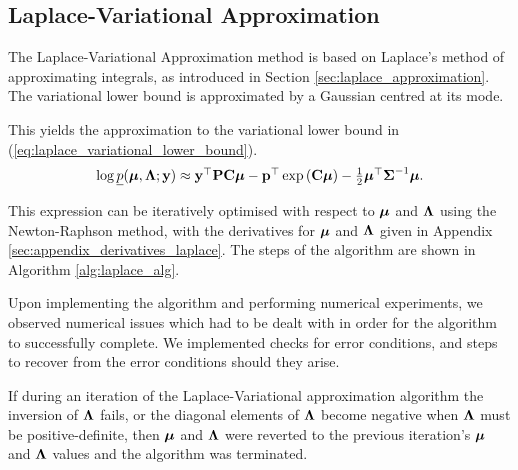 \subsection{Laplace-Variational Approximation}
The Laplace-Variational Approximation method is based on Laplace's method of approximating integrals, as
introduced in Section \ref{sec:laplace_approximation}. The variational lower bound  is approximated by a
Gaussian centred at its mode.

This yields the approximation to the variational lower bound in (\ref{eq:laplace_variational_lower_bound}).
\begin{equation}
\label{eq:laplace_variational_lower_bound}
\begin{array}{ll}
	\log \underline{p}({\boldsymbol \mu}, {\boldsymbol \Lambda}; {\bf y}) \approx {\bf y}^\top{\bf P}{\bf C}{\boldsymbol\mu} - {\bf p}^\top\exp \left ({\bf C} {\boldsymbol \mu} \right ) - \tfrac{1}{2} {\boldsymbol \mu}^\top {\boldsymbol\Sigma}^{-1} {\boldsymbol \mu}. 
\end{array}
\end{equation}
		
\noindent This expression can be iteratively optimised with respect to ${\boldsymbol \mu}$ and ${\boldsymbol \Lambda}$ using the
Newton-Raphson method, with the derivatives for ${\boldsymbol \mu}$ and ${\boldsymbol \Lambda}$ given in Appendix
\ref{sec:appendix_derivatives_laplace}. The steps of the algorithm are shown in Algorithm \ref{alg:laplace_alg}.
		
Upon implementing the algorithm and performing numerical experiments, we observed numerical issues which had to be dealt with in 
order for the algorithm to successfully complete.
We implemented checks for error conditions, and steps to recover from the error conditions should
they arise.

If during an iteration of the Laplace-Variational approximation algorithm the inversion  of ${\boldsymbol \Lambda}$
fails, or the diagonal elements of ${\boldsymbol \Lambda}$ become negative when ${\boldsymbol \Lambda}$ must be positive-definite,
then ${\boldsymbol \mu}$ and ${\boldsymbol \Lambda}$ were reverted to the previous iteration's ${\boldsymbol \mu}$ and ${\boldsymbol \Lambda}$ values and
the algorithm was terminated.

